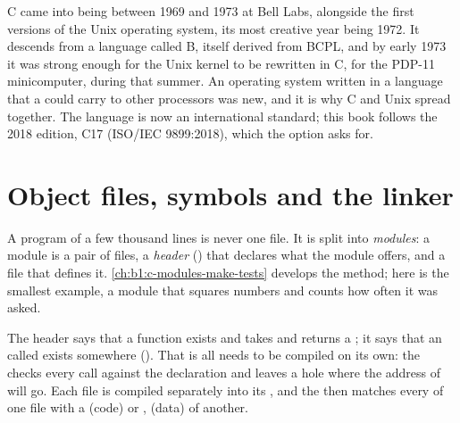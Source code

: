 \begin{history}
C came into being between 1969 and 1973 at Bell Labs, alongside the first versions of the Unix operating system,
its most creative year being 1972. It descends from a language called B, itself derived from BCPL, and by early
1973 it was strong enough for the Unix kernel to be rewritten in C, for the PDP-11 minicomputer, during that
summer. An operating system written in a language that a  could carry to other processors was new, and
it is why C and Unix spread together. The language is now an international standard; this book follows the
2018 edition, C17 (ISO/IEC 9899:2018), which the  option asks for.
\end{history}


\section{Object files, symbols and the linker}\label{sec:b1:compilation-pipeline:linker}

A program of a few thousand lines is never one file. It is split into \emph{modules}: a module is a pair of
files, a \emph{header} () that declares what the module offers, and a  file that defines it.
\cref{ch:b1:c-modules-make-tests} develops the method; here is the smallest example, a module that
squares numbers and counts how often it was asked.

\label{lst:b1:compilation-pipeline:square-h}

\label{lst:b1:compilation-pipeline:square-c}

\label{lst:b1:compilation-pipeline:main}

The header says that a function  exists and takes and returns a ; it says that an
 called  exists somewhere (). That is all  needs to be
compiled on its own: the  checks every call against the declaration and leaves a hole where the
address of  will go. Each  file is compiled separately into its , and the
 then matches every  of one file with a  (code) or ,  (data) of another.

